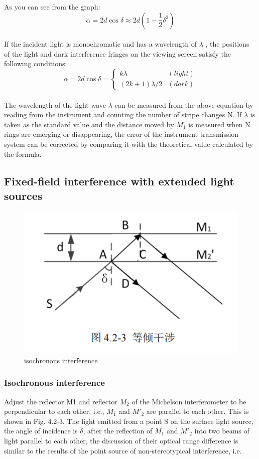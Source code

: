 \documentclass[UTF8]{article}
\begin{document}
As you can see from the graph:\\
        \[ \alpha = 2d\cos \delta \approx 2d(1-\frac{1}{2}\delta ^{2})\]\\
   
 If the incident light is monochromatic and has a wavelength of $\lambda$ , the positions of the light and dark interference fringes on the viewing screen satisfy the following conditions:\\

 \[ \alpha =2d\cos \delta =\begin{cases}  k\lambda & (light)\\  (2k+1)\lambda /2& (dark)\end{cases} \]\\
   
The wavelength of the light wave $\lambda$ can be measured from the above equation by reading from the instrument and counting the number of stripe changes N. If $\lambda$ is taken as the standard value and the distance moved by $M_1$ is measured when N rings are emerging or disappearing, the error of the instrument transmission system can be corrected by comparing it with the theoretical value calculated by the formula.

   \subsection{Fixed-field interference with extended light sources}

\begin{figure}[h]
    \centering
    \includegraphics[width=0.5\linewidth]{FIG5.png}
    \caption{isochronous interference}
\end{figure}
   \subsubsection{Isochronous interference}
Adjust the reflector M1 and reflector $M_2$ of the Michelson interferometer to be perpendicular to each other, i.e., $M_1$ and $M'_2$ are parallel to each other. This is shown in Fig. 4.2-3. The light emitted from a point S on the surface light source, the angle of incidence is $\delta$, after the reflection of $M_1$ and $M'_2$ into two beams of light parallel to each other, the discussion of their optical range difference is similar to the results of the point source of non-stereotypical interference, i.e.\\
\end{document}
